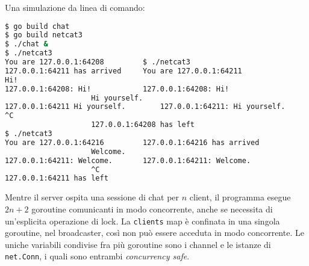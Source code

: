 \documentclass[../../thesis.tex]{subfiles}
\begin{document}
    Una simulazione da linea di comando:
    \begin{lstlisting}[language = bash, frame = L,label={lst:lstlisting7-10.4}]
$ go build chat
$ go build netcat3
$ ./chat &
$ ./netcat3
You are 127.0.0.1:64208			$ ./netcat3
127.0.0.1:64211 has arrived		You are 127.0.0.1:64211
Hi!
127.0.0.1:64208: Hi!			127.0.0.1:64208: Hi!
					Hi yourself.
127.0.0.1:64211 Hi yourself.		127.0.0.1:64211: Hi yourself.
^C
					127.0.0.1:64208 has left
$ ./netcat3
You are 127.0.0.1:64216			127.0.0.1:64216 has arrived
					Welcome.
127.0.0.1:64211: Welcome.		127.0.0.1:64211: Welcome.
					^C
127.0.0.1:64211 has left
    \end{lstlisting}
    Mentre il server ospita una sessione di chat per $n$ client, il programma esegue $2n+2$ goroutine comunicanti in modo concorrente, anche se necessita di un'esplicita operazione di lock.
    La \verb"clients" map è confinata in una singola goroutine, nel broadcaster, così non può essere acceduta in modo concorrente.
    Le uniche variabili condivise fra più goroutine sono i channel e le istanze di \verb"net.Conn", i quali sono entrambi \textit{concurrency safe}.
\end{document}
